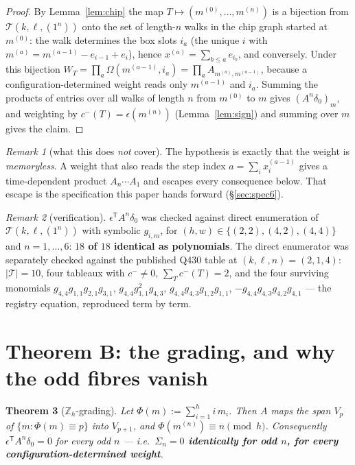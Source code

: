 \documentclass[11pt]{article}
\theoremstyle{plain}
\newtheorem{theorem}{Theorem}
\theoremstyle{definition}
\theoremstyle{remark}
\newtheorem{remark}[theorem]{Remark}
\newcommand{\cm}{c^{-}}
\begin{document}
\begin{proof}
By Lemma~\ref{lem:chip} the map $T\mapsto(m^{(0)},\dots,m^{(n)})$ is a bijection from
$\mathcal T(k,\ell,(1^n))$ onto the set of length-$n$ walks in the chip graph started at
$m^{(0)}$: the walk determines the box slots $i_a$ (the unique $i$ with
$m^{(a)}=m^{(a-1)}-e_{i-1}+e_i$), hence $x^{(a)}=\sum_{b\le a}e_{i_b}$, and conversely. Under
this bijection $W_T=\prod_{a}\Omega(m^{(a-1)},i_a)=\prod_a A_{m^{(a)},m^{(a-1)}}$, because a
configuration-determined weight reads only $m^{(a-1)}$ and $i_a$. Summing the products of
entries over all walks of length $n$ from $m^{(0)}$ to $m$ gives $(A^n\delta_0)_m$, and
weighting by $\cm(T)=\epsilon(m^{(n)})$ (Lemma~\ref{lem:sign}) and summing over $m$ gives the
claim.
\end{proof}

\begin{remark}[what this does \emph{not} cover]
The hypothesis is exactly that the weight is \emph{memoryless}. A weight that also reads the
step index $a=\sum_i x^{(a-1)}_i$ gives a time-dependent product $A_n\cdots A_1$ and escapes
every consequence below. That escape is the specification this paper hands forward
(\S\ref{sec:spec6}).
\end{remark}

\begin{remark}[verification]
$\epsilon^{\mathsf T}A^n\delta_0$ was checked against direct enumeration of
$\mathcal T(k,\ell,(1^n))$ with symbolic $g_{i,m}$, for $(h,w)\in\{(2,2),(4,2),(4,4)\}$ and
$n=1,\dots,6$: \textbf{$18$ of $18$ identical as polynomials}. The direct enumerator was
separately checked against the published Q430 table at $(k,\ell,n)=(2,1,4)$: $|{\mathcal T}|=10$,
four tableaux with $\cm\neq0$, $\sum_T\cm(T)=2$, and the four surviving monomials
$g_{4,4}g_{1,1}g_{2,1}g_{3,1}$, $g_{4,4}g_{1,1}^2g_{4,3}$, $g_{4,4}g_{4,3}g_{1,2}g_{1,1}$,
$-g_{4,4}g_{4,3}g_{4,2}g_{4,1}$ --- the registry equation, reproduced term by term.
\end{remark}

\section{Theorem B: the grading, and why the odd fibres vanish}

\begin{theorem}[$\mathbb{Z}_h$-grading]\label{thm:grade}
Let $\Phi(m):=\sum_{i=1}^h i\,m_i$. Then $A$ maps the span $V_p$ of $\{m:\Phi(m)\equiv p\}$ into
$V_{p+1}$, and $\Phi(m^{(n)})\equiv n \pmod h$. Consequently $\epsilon^{\mathsf T}A^n\delta_0=0$
for every odd $n$ --- i.e.\ \textbf{$\Sigma_n=0$ identically for odd $n$, for every
configuration-determined weight}.
\end{theorem}
\end{document}
